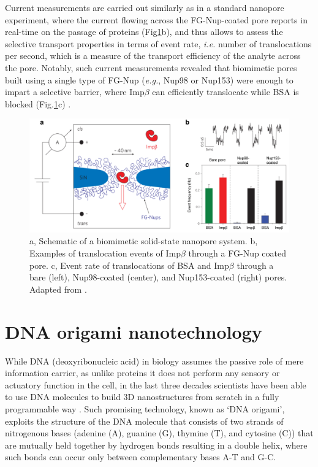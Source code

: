 Current measurements are carried out similarly as in a standard nanopore experiment, where the current flowing across the FG-Nup-coated pore reports in real-time on the passage of proteins (Fig\ref{fig:fig1.7}b), and thus allows to assess the selective transport properties in terms of event rate, \emph{i.e.} number of translocations per second, which is a measure of the transport efficiency of the analyte across the pore. Notably, such current measurements revealed that biomimetic pores built using a single type of FG-Nup (\emph{e.g.}, Nup98 or Nup153) were enough to impart a selective barrier, where Imp$\beta$ can efficiently translocate while BSA is blocked (Fig.\ref{fig:fig1.7}c) \cite{Jovanovic-Talisman2009,Kowalczyk2011a,Ananth2018}.
\begin{figure}[!htbp]
	\centering
	\includegraphics[width=0.95\linewidth]{figures/Figure1.7.pdf}
	\caption{a, Schematic of a biomimetic solid-state nanopore system. b, Examples of translocation events of Imp$\beta$ through a FG-Nup coated pore. c, Event rate of translocations of BSA and Imp$\beta$ through a bare (left), Nup98-coated (center), and Nup153-coated (right) pores. Adapted from \cite{Kowalczyk2011a}.}
	\label{fig:fig1.7}
\end{figure}

\section[DNA origami nanotechnology]{DNA origami nanotechnology}
While DNA (deoxyribonucleic acid) in biology assumes the passive role of mere information carrier, as unlike proteins it does not perform any sensory or actuatory function in the cell, in the last three decades scientists have been able to use DNA molecules to build 3D nanostructures from scratch in a fully programmable way \cite{Rothemund2006,Wagenbauer2017a}. Such promising technology, known as ‘DNA origami’, exploits the structure of the DNA molecule that consists of two strands of nitrogenous bases (adenine (A), guanine (G), thymine (T), and cytosine (C)) that are mutually held together by hydrogen bonds resulting in a double helix, where such bonds can occur only between complementary bases A-T and G-C. 

